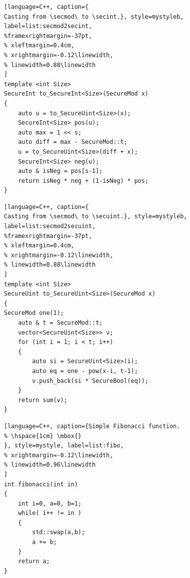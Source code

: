 \begin{figure}[!t]
\begin{minipage}{\linewidth}
\begin{lstlisting}[language=C++, caption={
Casting from \secmod\ to \secint.}, style=mystyleb, label=list:secmod2secint,
%framexrightmargin=-37pt,
% xleftmargin=0.4cm,
% xrightmargin=-0.12\linewidth,
% linewidth=0.88\linewidth
]
template <int Size>
SecureInt to_SecureInt<Size>(SecureMod x)
{
    auto u = to_SecureUint<Size>(x);
    SecureInt<Size> pos(u);
    auto max = 1 << s;
    auto diff = max - SecureMod::t;
    u = to_SecureUint<Size>(diff + x);
    SecureInt<Size> neg(u);
    auto & isNeg = pos[s-1];
    return isNeg * neg + (1-isNeg) * pos;
}
\end{lstlisting}
\end{minipage}
\vspace{-0.5cm} 

\end{figure}

\begin{figure}[!t]
\begin{minipage}{\linewidth}
\begin{lstlisting}[language=C++, caption={
Casting from \secmod\ to \secuint.}, style=mystyleb, label=list:secmod2secuint,
%framexrightmargin=-37pt,
% xleftmargin=0.4cm,
% xrightmargin=-0.12\linewidth,
% linewidth=0.88\linewidth
]
template <int Size>
SecureUint to_SecureUint<Size>(SecureMod x)
{
SecureMod one(1);
    auto & t = SecureMod::t;
    vector<SecureUint<Size>> v;
    for (int i = 1; i < t; i++)
    {
        auto si = SecureUint<Size>(i);
        auto eq = one - pow(x-i, t-1);
        v.push_back(si * SecureBool(eq));
    }
    return sum(v);
}
\end{lstlisting}
\end{minipage}
\vspace{-0.5cm} 
\end{figure}

\begin{figure}
\begin{minipage}{\linewidth}
\begin{lstlisting}[language=C++, caption={Simple Fibonacci function.
% \hspace{1cm} \mbox{}
}, style=mystyle, label=list:fibo, 
% xrightmargin=-0.12\linewidth,
% linewidth=0.96\linewidth
]
int fibonacci(int in)
{
    int i=0, a=0, b=1;
    while( i++ != in )
    {
        std::swap(a,b);
        a += b;
    }
    return a;
}
\end{lstlisting}
\end{minipage}
\vspace{-0.1in}
\end{figure}

